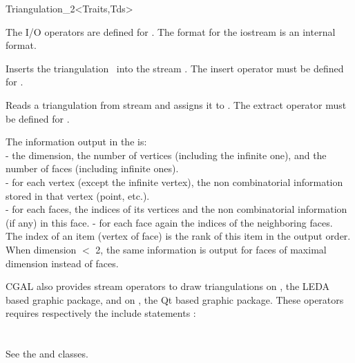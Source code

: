 \begin{ccRefClass}{Triangulation_2<Traits,Tds>}


The I/O operators are defined for .
The format for the iostream
is an internal format. 


{Inserts the triangulation \ccVar\ into the stream .
\ccPrecond The insert operator must be defined for .}

{Reads a triangulation from stream  and assigns it
to \ccVar. \ccPrecond The extract operator must be defined for .}

The information output  in the  is: \\
- the dimension, the number of vertices (including the infinite one), 
 and the number of faces (including infinite ones). \\
- for each vertex (except the infinite vertex), 
the non combinatorial information stored in  that vertex
(point, etc.). \\
- for each faces,  the indices of its vertices and 
the non combinatorial information (if any) in  this face.
- for each face again 
 the indices of the neighboring faces. \\
The  index of an item  (vertex of face) is
the rank of this item in the output order.
When dimension $<$ 2, the same information is output
for faces of maximal dimension instead of faces.



CGAL also provides  stream operators \ccc{ <<}  to draw triangulations
on , the LEDA based graphic package,
and on , the Qt based graphic package.
These operators requires respectively  the include statements : \\
 \\
\\
See the  and  classes.




\end{ccRefClass}
